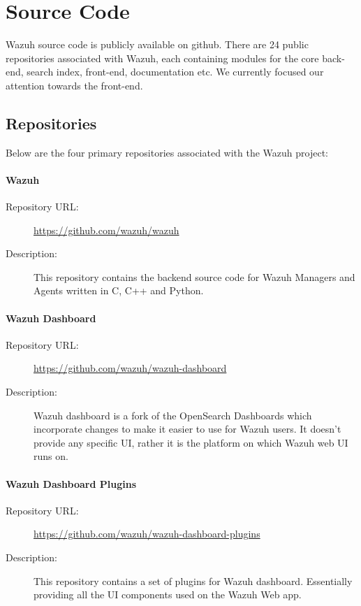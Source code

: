 \newpage
\section{Source Code}
Wazuh source code is publicly available on github. There are 24 public repositories associated with Wazuh, each containing modules for the core back-end, search index, front-end, documentation etc. We currently focused our attention towards the front-end.

\subsection{Repositories}
Below are the four primary repositories associated with the Wazuh project:

\paragraph*{Wazuh}
\begin{description}
    \item[Repository URL:] \url{https://github.com/wazuh/wazuh}
    \item[Description:] This repository contains the backend source code for Wazuh Managers and Agents written in C, C++ and Python.
\end{description}

\paragraph*{Wazuh Dashboard}
\begin{description}
    \item[Repository URL:] \url{https://github.com/wazuh/wazuh-dashboard}
    \item[Description:] Wazuh dashboard is a fork of the OpenSearch Dashboards which incorporate changes to make it easier to use for Wazuh users. It doesn't provide any specific UI, rather it is the platform on which Wazuh web UI runs on.
\end{description}

\paragraph*{Wazuh Dashboard Plugins}
\begin{description}
    \item[Repository URL:] \url{https://github.com/wazuh/wazuh-dashboard-plugins}
    \item[Description:] This repository contains a set of plugins for Wazuh dashboard. Essentially providing all the UI components used on the Wazuh Web app.
\end{description}

